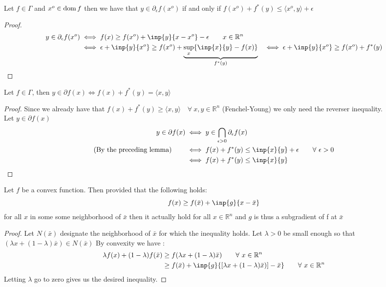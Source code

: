 \begin{lemma}
	Let $f\in\Gamma$ and $x^o \in\mathrm{dom} \, f$ then we have that
	$y \in\partial_\epsilon f(x^o)$ if and only if 
	$f(x^o)+f^*(y) \leq \langle x^o,y\rangle + \epsilon$ 
	\label{FYepsilon}
\end{lemma}
\begin{proof}
	\begin{align*}
		y\in\partial_\epsilon f(x^o) &\iff 
		f(x) \geq f(x^o) + \inp{y}{x-x^o} - \epsilon
		\qquad x\in\mathbb R^n \\
		&\iff \epsilon + \inp{y}{x^o} \geq f(x^o) 
		+\underbrace{\sup_x \{\inp{x}{y} - f(x)\}}_{f^*(y)}
		&\iff \epsilon + \inp{y}{x^o} \geq f(x^o) + f^*(y)
\end{align*}
\end{proof}
\begin{lemma}\label{fenchelDualLemma}
	Let $f\in \Gamma$, then $y\in \partial f(x) \iff 
	f(x) + f^*(y) = \langle x,y \rangle $
\end{lemma}
\begin{proof}
    Since we already have that $f(x)+f^*(y)\geq\langle x,y\rangle \quad \forall\ x,y\in\mathbb R^n$ (Fenchel-Young)
    we only need the reverser inequality.\\
Let $y \in \partial f(x)$ 
\begin{align*}
    y \in \partial f(x) &\iff y \in \bigcap_{\epsilon>0}\partial_{\epsilon}f(x)\\
    \text{(By the preceding lemma)} \qquad 
    &\iff f(x) + f^*(y) \leq \inp{x}{y} + \epsilon \qquad \forall \ \epsilon > 0 \\
    &\iff f(x) + f^*(y) \leq \inp{x}{y} 
\end{align*}
\end{proof}
\begin{lemma}\label{lemma:neighToGlobal}
  Let $f$ be a convex function. Then provided that the following
  holds:
  \begin{equation}
    f(x) \geq f(\bar x) + \inp{g}{x-\bar x} 
  \end{equation}
  for all $x$ in some some neighborhood of $\bar x$ then it actually
  hold for all $x \in \mathbb R^n$ and $g$ is thus a subgradient of
  f at $\bar x$
  \begin{proof}
    Let $N(\bar x)$ designate the neighborhood of $\bar x$ for which
    the inequality holds. Let $\lambda >0$ be small enough 
    so that $(\lambda x+ (1-\lambda)\bar x) \in N(\bar x)$
    By convexity we have :
    \begin{align}
%
      \lambda f(x) + (1-\lambda)f(\bar x) &\geq
      f(\lambda x + (1-\lambda)\bar x) \qquad \forall \ x \in \mathbb R^n  \\
      &\geq f(\bar x) + \inp{g}{[\lambda x + (1-\lambda)\bar x)] - \bar x} 
      \qquad \forall \ x \in \mathbb R^n 
%
    \end{align}
  Letting $\lambda$ go to zero gives us the desired inequality.
  \end{proof}
\end{lemma}
\clearpage

